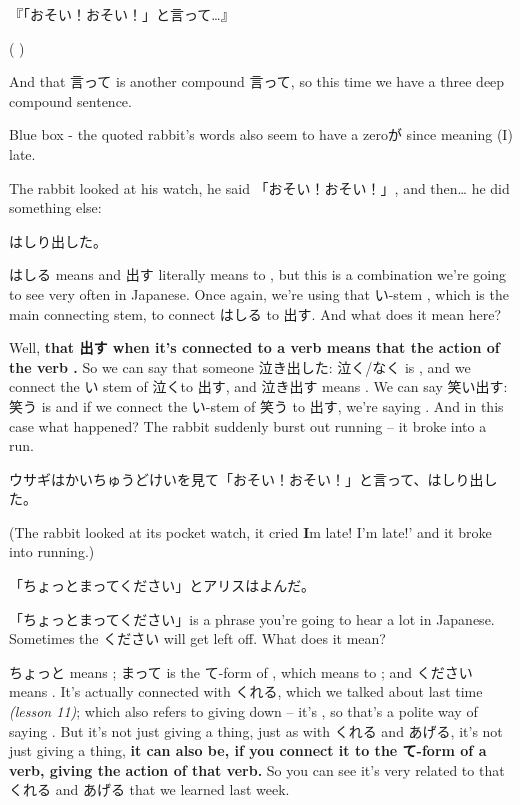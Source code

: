 『「おそい！おそい！」と言って\ldots{}』

( )

And that 言って is another compound 言って, so this time we have a three deep compound sentence.

{}

Blue box - the quoted rabbit's words also seem to have a zeroが since meaning (I) late.

The rabbit looked at his watch, he said 「おそい！おそい！」, and then\ldots{} he did something else:

\startblockquote
はしり出した。
\stopblockquote

はしる means  and 出す literally means to , but this is a combination we're going to see very often in Japanese. Once again, we're using that い-stem , which is the main connecting stem, to connect はしる to 出す. And what does it mean here?

{}

Well, {\bf that 出す when it's connected to a verb means that the action of the verb .} So we can say that someone 泣き出した: 泣く/なく is , and we connect the い stem of 泣くto 出す, and 泣き出す means . We can say 笑い出す: 笑う is  and if we connect the い-stem of 笑う to 出す, we're saying . And in this case what happened? The rabbit suddenly burst out running -- it broke into a run.

ウサギはかいちゅうどけいを見て「おそい！おそい！」と言って、はしり出した。

(The rabbit looked at its pocket watch, it cried {\bf I}m late! I'm late!' and it broke into running.)

{}

\startblockquote
「ちょっとまってください」とアリスはよんだ。
\stopblockquote

{}

「ちょっとまってください」is a phrase you're going to hear a lot in Japanese. Sometimes the ください will get left off. What does it mean?

ちょっと means ; まって is the て-form of , which means to ; and ください means . It's actually connected with くれる, which we talked about last time {\em (lesson 11)}; which also refers to giving down -- it's , so that's a polite way of saying . But it's not just giving a thing, just as with くれる and あげる, it's not just giving a thing, {\bf it can also be, if you connect it to the て-form of a verb, giving the action of that verb.} So you can see it's very related to that くれる and あげる that we learned last week.

